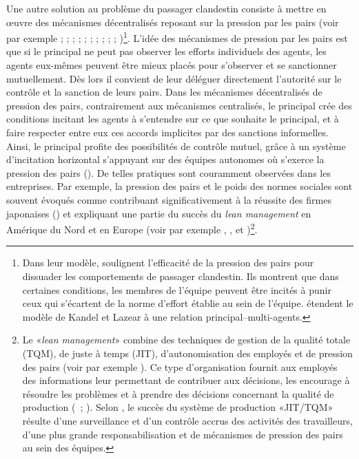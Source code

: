 \begin{Article}
\begin{refsection}[Lebourges]
Une autre solution au problème du passager clandestin consiste à mettre
en œuvre des mécanismes décentralisés reposant sur la pression par les
pairs (voir par exemple \textcite{Radner1986}; \textcite{Coleman1990}; \textcite{Varian1990}; \textcite{KandelLazear1992}; \textcite{Itoh1993}; \textcite{Villadsen1995}; \textcite{AryaFellinghamGlover1997}; \textcite{BarronPaulsonGjerde1997}; \textcite{Prendergast1999}; \textcite{Towry2003}; \textcite{CarpenterBowlesGintisHwang2009})\footnote{Dans leur modèle, \textcite{KandelLazear1992} soulignent l'efficacité de la pression des pairs pour
  dissuader les comportements de passager clandestin. Ils montrent que
  dans certaines conditions, les membres de l'équipe peuvent être
  incités à punir ceux qui s'écartent de la norme d'effort établie au
  sein de l'équipe. \textcite{BarronPaulsonGjerde1997} étendent le modèle de
  Kandel et Lazear à une relation principal--multi-agents.}. L'idée des
mécanismes de pression par les pairs est que si le principal ne peut pas
observer les efforts individuels des agents, les agents eux-mêmes
peuvent être mieux placés pour s'observer et se sanctionner
mutuellement. Dès lors il convient de leur déléguer directement
l'autorité sur le contrôle et la sanction de leurs pairs. Dans les
mécanismes décentralisés de pression des pairs, contrairement aux
mécanismes centralisés, le principal crée des conditions incitant les
agents à s'entendre sur ce que souhaite le principal, et à faire
respecter entre eux ces accords implicites par des sanctions
informelles. Ainsi, le principal profite des possibilités de contrôle
mutuel, grâce à un système d'incitation horizontal s'appuyant sur des
équipes autonomes où s'exerce la pression des pairs (\textcite{Towry2003}).
De telles pratiques sont couramment observées dans les entreprises. Par
exemple, la pression des pairs et le poids des normes sociales sont
souvent évoqués comme contribuant significativement à la réussite des
firmes japonaises (\textcite{NahavandiAranda1994}) et expliquant une
partie du succès du \emph{lean management} en Amérique du Nord et en
Europe (voir par exemple \textcite{DelbridgeTurnbullWilkinson1992},
\textcite{Winfield1994}, \textcite{Lazega2000} et \textcite{ShahWard2003})\footnote{Le «\emph{lean management}» combine des
  techniques de gestion de la qualité totale (TQM), de juste à temps
  (JIT), d'autonomisation des employés et de pression des pairs (voir
  par exemple \textcite{ShahWard2003}). Ce type d'organisation fournit
  aux employés des informations leur permettant de contribuer aux
  décisions, les encourage à résoudre les problèmes et à prendre des
  décisions concernant la qualité de production (\textcite{PattersonWestWall2004}~; \textcite{BowenLawlerIII2006}). Selon \textcite{DelbridgeTurnbullWilkinson1992}, le succès du système de production «JIT/TQM»
  résulte d'une surveillance et d'un contrôle accrus des activités des
  travailleurs, d'une plus grande responsabilisation et de mécanismes de
  pression des pairs au sein des équipes.}.


\end{refsection}
\end{Article}
